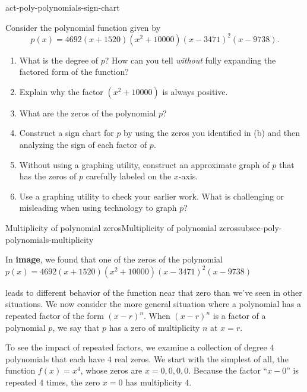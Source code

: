 \documentclass{ximera}
\begin{document}
\begin{exploration}{}{act-poly-polynomials-sign-chart}%

Consider the polynomial function given by%
\[
p(x) = 4692(x+1520)(x^2+10000)(x-3471)^2(x-9738)\text{.}
\]
%

\begin{enumerate}[label=\alph*.]
\item What is the degree of $p$?  How can you tell \emph{without} fully expanding the factored form of the function?%
\item Explain why the factor $(x^2 + 10000)$ is always positive.%
\item What are the zeros of the polynomial $p$?%
\item Construct a sign chart for $p$ by using the zeros you identified in (b) and then analyzing the sign of each factor of $p$.%
\item Without using a graphing utility, construct an approximate graph of $p$ that has the zeros of $p$ carefully labeled on the $x$-axis.%
\item Use a graphing utility to check your earlier work.  What is challenging or misleading when using technology to graph $p$?%
\end{enumerate}
%
\end{exploration}

%
%
%
{Multiplicity of polynomial zeros}{}{Multiplicity of polynomial zeros}{}{}{subsec-poly-polynomials-multiplicity}

In \textbf{image}, we found that one of the zeros of the polynomial $p(x)=4692(x + 1520)(x^{2} + 10000)(x - 3471)^{2}(x - 9738)$

 leads to different behavior of the function near that zero than we've seen in other situations.  We now consider the more general situation where a polynomial has a repeated factor of the form $(x-r)^{n}$.  When $(x-r)^{n}$ is a factor of a polynomial $p$, we say that $p$ has a zero of multiplicity $n$ at $x=r$. 

To see the impact of repeated factors, we examine a collection of degree $4$ polynomials that each have $4$ real zeros.  We start with the simplest of all, the function $f(x) = x^4$, whose zeros are $x = 0, 0, 0, 0$.  Because the factor ``$x-0$'' is repeated $4$ times, the zero $x = 0$ has multiplicity $4$.%
\end{document}
